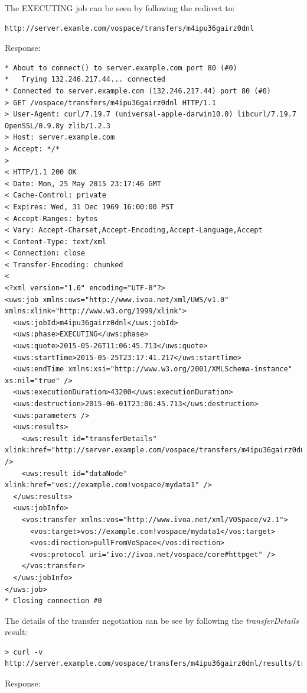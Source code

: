 \documentclass[11pt,a4paper]{ivoa}
\begin{document}
The EXECUTING job can be seen by following the redirect to:
\begin{lstlisting}
http://server.examle.com/vospace/transfers/m4ipu36gairz0dnl
\end{lstlisting}
Response:
\begin{lstlisting}
* About to connect() to server.example.com port 80 (#0)
*   Trying 132.246.217.44... connected
* Connected to server.example.com (132.246.217.44) port 80 (#0)
> GET /vospace/transfers/m4ipu36gairz0dnl HTTP/1.1
> User-Agent: curl/7.19.7 (universal-apple-darwin10.0) libcurl/7.19.7 OpenSSL/0.9.8y zlib/1.2.3
> Host: server.example.com
> Accept: */*
>
< HTTP/1.1 200 OK
< Date: Mon, 25 May 2015 23:17:46 GMT
< Cache-Control: private
< Expires: Wed, 31 Dec 1969 16:00:00 PST
< Accept-Ranges: bytes
< Vary: Accept-Charset,Accept-Encoding,Accept-Language,Accept
< Content-Type: text/xml
< Connection: close
< Transfer-Encoding: chunked
<
<?xml version="1.0" encoding="UTF-8"?>
<uws:job xmlns:uws="http://www.ivoa.net/xml/UWS/v1.0" xmlns:xlink="http://www.w3.org/1999/xlink">
  <uws:jobId>m4ipu36gairz0dnl</uws:jobId>
  <uws:phase>EXECUTING</uws:phase>
  <uws:quote>2015-05-26T11:06:45.713</uws:quote>
  <uws:startTime>2015-05-25T23:17:41.217</uws:startTime>
  <uws:endTime xmlns:xsi="http://www.w3.org/2001/XMLSchema-instance" xs:nil="true" />
  <uws:executionDuration>43200</uws:executionDuration>
  <uws:destruction>2015-06-01T23:06:45.713</uws:destruction>
  <uws:parameters />
  <uws:results>
    <uws:result id="transferDetails" xlink:href="http://server.example.com/vospace/transfers/m4ipu36gairz0dnl/results/transferDetails" />
    <uws:result id="dataNode" xlink:href="vos://example.com!vospace/mydata1" />
  </uws:results>
  <uws:jobInfo>
    <vos:transfer xmlns:vos="http://www.ivoa.net/xml/VOSpace/v2.1">
      <vos:target>vos://example.com!vospace/mydata1</vos:target>
      <vos:direction>pullFromVoSpace</vos:direction>
      <vos:protocol uri="ivo://ivoa.net/vospace/core#httpget" />
    </vos:transfer>
  </uws:jobInfo>
</uws:job>
* Closing connection #0
\end{lstlisting}
The details of the transfer negotiation can be see by following the \emph{transferDetails} result:
\begin{lstlisting}
> curl -v http://server.example.com/vospace/transfers/m4ipu36gairz0dnl/results/transferDetails
\end{lstlisting}
Response:
\end{document}
